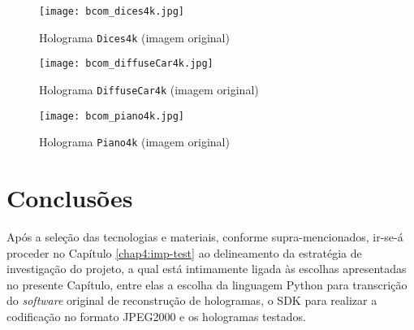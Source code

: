\begin{figure}
    \centering
    \texttt{[image: bcom\_dices4k.jpg]}
    \caption{Holograma \texttt{Dices4k} (imagem original)}
    \label{fig:bcom_dices4k}
\end{figure}

\begin{figure}
    \centering
    \texttt{[image: bcom\_diffuseCar4k.jpg]}
    \caption{Holograma \texttt{DiffuseCar4k} (imagem original)}
    \label{fig:bcom_diffuseCar4k}
\end{figure}

\begin{figure}
    \centering
    \texttt{[image: bcom\_piano4k.jpg]}
    \caption{Holograma \texttt{Piano4k} (imagem original)}
    \label{fig:bcom_piano4k}
\end{figure}


\section{Conclusões}
\label{chap3:sec:concs}

Após a seleção das tecnologias e materiais, conforme supra-mencionados, ir-se-á proceder no Capítulo \ref{chap4:imp-test} ao delineamento da estratégia de investigação do projeto, a qual está intimamente ligada às escolhas apresentadas no presente Capítulo, entre elas a escolha da linguagem Python para transcrição do \textit{software} original de reconstrução de hologramas, o \ac{SDK} para realizar a codificação no formato JPEG2000 e os hologramas testados.


